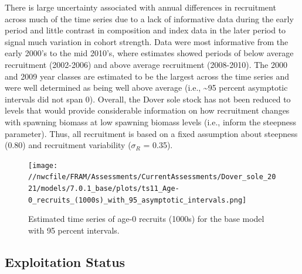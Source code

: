 \documentclass[11pt,
  english,
  a4paper,
]{article}
\begin{document}
There is large uncertainty associated with annual differences in recruitment across much of the time series due to a lack of informative data during the early period and little contrast in composition and index data in the later period to signal much variation in cohort strength. Data were most informative from the early 2000's to the mid 2010's, where estimates showed periods of below average recruitment (2002-2006) and above average recruitment (2008-2010). The 2000 and 2009 year classes are estimated to be the largest across the time series and were well determined as being well above average (i.e., \textasciitilde95 percent asymptotic intervals did not span 0). Overall, the Dover sole stock has not been reduced to levels that would provide considerable information on how recruitment changes with spawning biomass at low spawning biomass levels (i.e., inform the steepness parameter). Thus, all recruitment is based on a fixed assumption about steepness (0.80) and recruitment variability ({\(\sigma_R\)\leavevmode\tagmcend\tagstructend} = 0.35).

\leavevmode\tagmcend\tagstructend\par




\begin{figure}
\centering
\texttt{[image: //nwcfile/FRAM/Assessments/CurrentAssessments/Dover\_sole\_2021/models/7.0.1\_base/plots/ts11\_Age-0\_recruits\_(1000s)\_with\_95\_asymptotic\_intervals.png]}
\caption{Estimated time series of age-0 recruits (1000s) for the base model with 95 percent intervals.\label{fig:es-recruits}}
\end{figure}

\tagmcend\tagstructend

\clearpage


\hypertarget{exploitation-status}{%
\subsection*{Exploitation Status}\label{exploitation-status}}

\leavevmode\tagmcend\tagstructend
\end{document}
